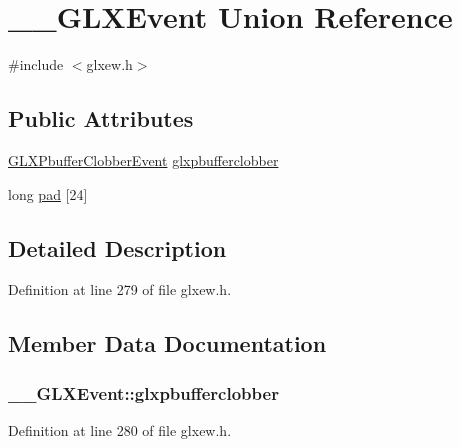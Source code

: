 \hypertarget{union_____g_l_x_event}{}\section{\+\_\+\+\_\+\+G\+L\+X\+Event Union Reference}
\label{union_____g_l_x_event}


{\ttfamily \#include $<$glxew.\+h$>$}

\subsection*{Public Attributes}
\begin{DoxyCompactItemize}
\item 
\hyperlink{struct_g_l_x_pbuffer_clobber_event}{G\+L\+X\+Pbuffer\+Clobber\+Event} \hyperlink{union_____g_l_x_event_ada5880e2b424bcb2f60a411aaf713fae}{glxpbufferclobber}
\item 
long \hyperlink{union_____g_l_x_event_a1cb8f6e7e77a34d25baf43b3f3bc2d4f}{pad} \mbox{[}24\mbox{]}
\end{DoxyCompactItemize}


\subsection{Detailed Description}


Definition at line 279 of file glxew.\+h.



\subsection{Member Data Documentation}
\hypertarget{union_____g_l_x_event_ada5880e2b424bcb2f60a411aaf713fae}{}
\subsubsection[{glxpbufferclobber}]{ \+\_\+\+\_\+\+G\+L\+X\+Event\+::glxpbufferclobber}\label{union_____g_l_x_event_ada5880e2b424bcb2f60a411aaf713fae}


Definition at line 280 of file glxew.\+h.

\hypertarget{union_____g_l_x_event_a1cb8f6e7e77a34d25baf43b3f3bc2d4f}{}
